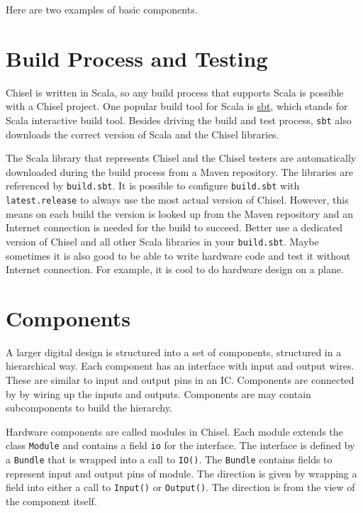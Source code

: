 \documentclass[%
    10pt, %
    headinclude, footexclude,
    openright, %
    notitlepage,
    cleardoubleempty,
    headsepline,
    pointlessnumbers,
    bibtotoc, idxtotoc,
    ]{scrbook}
\newcommand{\code}[1]{{\small{\texttt{#1}}}}
\newcommand{\myref}[2]{\href{#1}{#2}}
\begin{document}
Here are two examples of basic components.




\chapter{Build Process and Testing}

Chisel is written in Scala, so any build process that supports Scala is possible
with a Chisel project. One popular build tool for Scala is \myref{https://www.scala-sbt.org/}{sbt},
which stands for Scala interactive build tool.
Besides driving the build and test process, \code{sbt} also downloads the correct
version of Scala and the Chisel libraries.

The Scala library that represents Chisel and the Chisel testers are automatically
downloaded during the build process from a Maven repository.
The libraries are referenced by \code{build.sbt}. It is possible to configure \code{build.sbt}
with \code{latest.release} to always use the most actual version of Chisel.
However, this means on each build the version is looked up from the Maven
repository and an Internet connection is needed for the build to succeed.
Better use a dedicated version of Chisel and all other Scala libraries in your \code{build.sbt}.
Maybe sometimes it is also good to be able to write hardware code and test it without Internet connection.
For example, it is cool to do hardware design on a plane.

\chapter{Components}

A larger digital design is structured into a set of components, structured in
a hierarchical way. Each component has an interface with input and output
wires. These are similar to input and output pins in an IC.
Components are connected by by wiring up the inputs and outputs.
Components are may contain subcomponents to build the hierarchy.

Hardware components are called modules in Chisel. Each module extends
the class \code{Module} and contains a field \code{io} for the interface.
The interface is defined by a \code{Bundle} that is wrapped into a call to \code{IO()}.
The \code{Bundle} contains fields to represent input and output pins of
module. The direction is given by wrapping a field into either a call to \code{Input()}
or \code{Output()}. The direction is from the view of the component itself.
\end{document}

